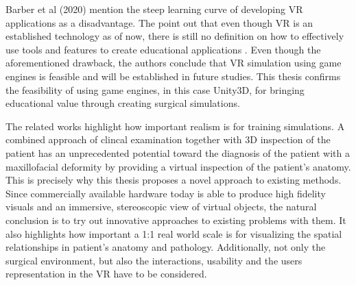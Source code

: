 Barber et al (2020) mention the steep learning curve of developing VR applications as a disadvantage.
The point out that even though VR is an established technology as of now, there is still no definition on how to effectively use tools and features to create educational applications \cite{Barber.2020}.
Even though the aforementioned drawback, the authors conclude that VR simulation using game engines is feasible and will be established in future studies.
This thesis confirms the feasibility of using game engines, in this case Unity3D, for bringing educational value through creating surgical simulations.

The related works highlight how important realism is for training simulations.
A combined approach of clincal examination together with 3D inspection of the patient has an unprecedented potential toward the diagnosis of the patient with a maxillofacial deformity \cite{swennen2009three} by providing a virtual inspection of the patient’s anatomy.
This is precisely why this thesis proposes a novel approach to existing methods.
Since commercially available hardware today is able to produce high fidelity visuals and an immersive, stereoscopic view of virtual objects,
the natural conclusion is to try out innovative approaches to existing problems with them.
It also highlights how important a 1:1 real world scale is for visualizing the spatial relationships in patient's anatomy and pathology.
Additionally, not only the surgical environment, but also the interactions, usability and the users representation in the VR have to be considered.